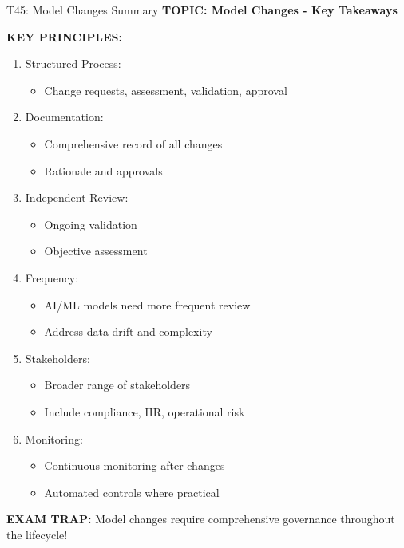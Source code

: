 \documentclass[8pt]{beamer}
\begin{document}
	\begin{frame}{T45: Model Changes Summary}
		\fontsize{6.5}{7.5}\selectfont
		\textbf{TOPIC: Model Changes - Key Takeaways}
		
		\vspace{0.1cm}
		\textbf{KEY PRINCIPLES:}
		\begin{enumerate}
			\item \textcolor{myblue}{Structured Process:}
			\begin{itemize}
				\item Change requests, assessment, validation, approval
			\end{itemize}
			\item \textcolor{myblue}{Documentation:}
			\begin{itemize}
				\item Comprehensive record of all changes
				\item Rationale and approvals
			\end{itemize}
			\item \textcolor{myblue}{Independent Review:}
			\begin{itemize}
				\item Ongoing validation
				\item Objective assessment
			\end{itemize}
			\item \textcolor{myblue}{Frequency:}
			\begin{itemize}
				\item AI/ML models need more frequent review
				\item Address data drift and complexity
			\end{itemize}
			\item \textcolor{myblue}{Stakeholders:}
			\begin{itemize}
				\item Broader range of stakeholders
				\item Include compliance, HR, operational risk
			\end{itemize}
			\item \textcolor{myblue}{Monitoring:}
			\begin{itemize}
				\item Continuous monitoring after changes
				\item Automated controls where practical
			\end{itemize}
		\end{enumerate}
		
		\textcolor{myred}{\textbf{EXAM TRAP:}} Model changes require \textcolor{myblue}{comprehensive governance throughout the lifecycle}!
	\end{frame}
	
\end{document}
